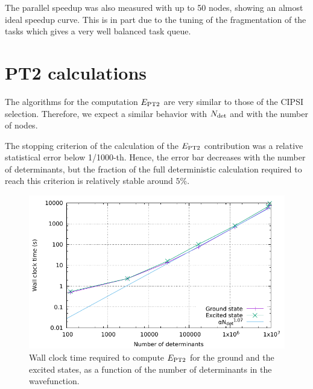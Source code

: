 \documentclass[./thesis.tex]{subfiles}
\begin{document}
The parallel speedup was also measured with up to 50 nodes, showing an almost ideal speedup curve. This is in part due to the tuning of the fragmentation of the
tasks which gives a very well balanced task queue.

\clearpage

\section{PT2 calculations}

The algorithms for the computation $E_\text{PT2}$ are very similar to those of the CIPSI selection. Therefore, we expect a similar behavior with ${N_\text{det}}$ and with the number of nodes.

The stopping criterion of the calculation of the $E_\text{PT2}$ contribution was a
relative statistical error below 1/1000-th. Hence, the error bar decreases with
the number of determinants, but the fraction of the full deterministic
calculation required to reach this criterion is relatively stable around $5$\%.

\begin{figure}[hbt]
	\begin{center}
		\includegraphics[width=0.8\columnwidth]{figures/perf/scaling_pt2_det}
		\caption{Wall clock time required to compute $E_\text{PT2}$ for the ground and the excited states, as a function of the number of determinants in the wavefunction.}
		\label{fig:scaling_det_pt2}
	\end{center}
\end{figure}
\end{document}
